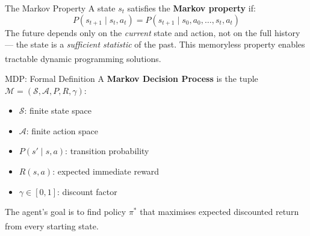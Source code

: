 \begin{v3topic}{The Markov Property}
        A state $s_t$ satisfies the \textbf{Markov property} if:
        \begin{equation}
            P(s_{t+1} \mid s_t, a_t) = P(s_{t+1} \mid s_0, a_0, \ldots, s_t, a_t)
        \end{equation}
        The future depends only on the \emph{current} state and action, not
        on the full history --- the state is a \emph{sufficient statistic} of
        the past. This memoryless property enables tractable dynamic
        programming solutions.\textsuperscript{\cite[][p.~140]{barberBayesianReasoningMachine2012}}

\end{v3topic}
\begin{v3topic}{MDP: Formal Definition}
        A \textbf{Markov Decision Process} is the tuple
        $\mathcal{M} = (\mathcal{S}, \mathcal{A}, P, R, \gamma)$:
        \begin{itemize}
            \item $\mathcal{S}$: finite state space
            \item $\mathcal{A}$: finite action space
            \item $P(s' \mid s, a)$: transition probability
            \item $R(s, a)$: expected immediate reward
            \item $\gamma \in [0,1]$: discount factor
        \end{itemize}
        The agent's goal is to find policy $\pi^*$ that maximises expected
        discounted return from every starting
        state.\textsuperscript{\cite[][p.~141]{barberBayesianReasoningMachine2012}}

\end{v3topic}
